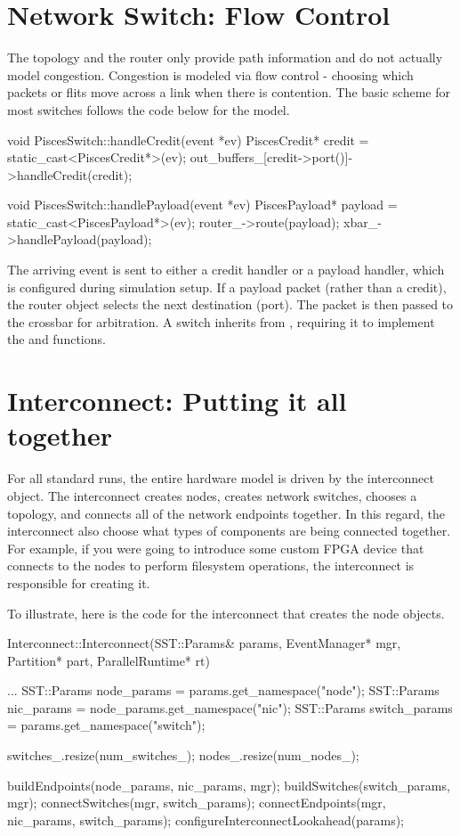 \section{Network Switch: Flow Control}\label{sec:networkSwitch}
The topology and the router only provide path information and do not actually model congestion.
Congestion is modeled via flow control - choosing which packets or flits move across a link when there is contention.
The basic scheme for most switches follows the code below for the  model.

\begin{CppCode}
void PiscesSwitch::handleCredit(event *ev)
{
  PiscesCredit* credit = static_cast<PiscesCredit*>(ev);
  out_buffers_[credit->port()]->handleCredit(credit);
}

void PiscesSwitch::handlePayload(event *ev)
{
  PiscesPayload* payload = static_cast<PiscesPayload*>(ev);
  router_->route(payload);
  xbar_->handlePayload(payload);
}
\end{CppCode}
The arriving event is sent to either a credit handler or a payload handler,
which is configured during simulation setup.
If a payload packet (rather than a credit), the router object selects the next destination (port).
The packet is then passed to the crossbar for arbitration.
A switch inherits from , requiring it to implement the  and  functions.

\section{Interconnect: Putting it all together}\label{sec:topInterconnect}
For all standard runs, the entire hardware model is driven by the interconnect object.
The interconnect creates nodes, creates network switches, chooses a topology, and connects all of the network endpoints together.
In this regard, the interconnect also choose what types of components are being connected together.
For example, if you were going to introduce some custom FPGA device that connects to the nodes to perform filesystem operations,
the interconnect is responsible for creating it.

To illustrate, here is the code for the interconnect that creates the node objects. 

\begin{CppCode}
Interconnect::Interconnect(SST::Params& params, EventManager* mgr, 
	Partition* part, ParallelRuntime* rt)
{
  ...
  SST::Params node_params = params.get_namespace("node");
  SST::Params nic_params = node_params.get_namespace("nic");
  SST::Params switch_params = params.get_namespace("switch");

  switches_.resize(num_switches_);
  nodes_.resize(num_nodes_);

  buildEndpoints(node_params, nic_params, mgr);
  buildSwitches(switch_params, mgr);
  connectSwitches(mgr, switch_params);
  connectEndpoints(mgr, nic_params, switch_params);
  configureInterconnectLookahead(params);
}
\end{CppCode}

